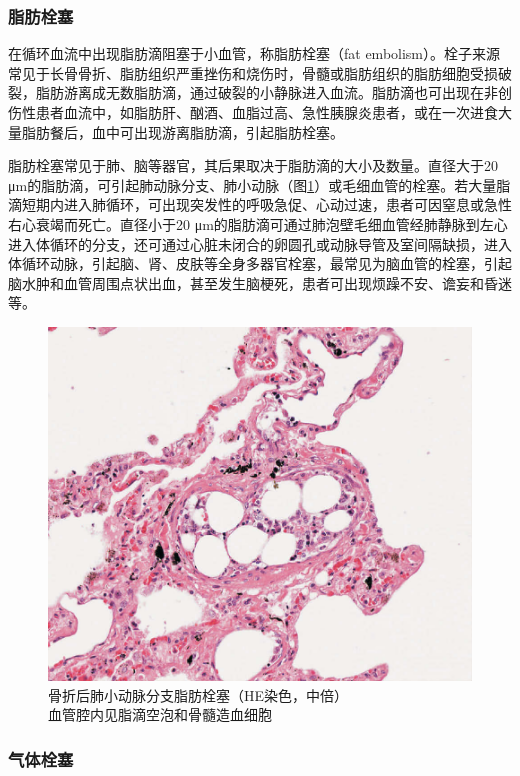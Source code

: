 \subsubsection{脂肪栓塞}

在循环血流中出现脂肪滴阻塞于小血管，称脂肪栓塞（fat
embolism）。栓子来源常见于长骨骨折、脂肪组织严重挫伤和烧伤时，骨髓或脂肪组织的脂肪细胞受损破裂，脂肪游离成无数脂肪滴，通过破裂的小静脉进入血流。脂肪滴也可出现在非创伤性患者血流中，如脂肪肝、酗酒、血脂过高、急性胰腺炎患者，或在一次进食大量脂肪餐后，血中可出现游离脂肪滴，引起脂肪栓塞。

脂肪栓塞常见于肺、脑等器官，其后果取决于脂肪滴的大小及数量。直径大于20
μm的脂肪滴，可引起肺动脉分支、肺小动脉（图\ref{fig3-10}）或毛细血管的栓塞。若大量脂滴短期内进入肺循环，可出现突发性的呼吸急促、心动过速，患者可因窒息或急性右心衰竭而死亡。直径小于20
μm的脂肪滴可通过肺泡壁毛细血管经肺静脉到左心进入体循环的分支，还可通过心脏未闭合的卵圆孔或动脉导管及室间隔缺损，进入体循环动脉，引起脑、肾、皮肤等全身多器官栓塞，最常见为脑血管的栓塞，引起脑水肿和血管周围点状出血，甚至发生脑梗死，患者可出现烦躁不安、谵妄和昏迷等。

\begin{figure}[!htbp]
  \centering
  \includegraphics{./images/Image00044.jpg}
  \caption{骨折后肺小动脉分支脂肪栓塞（HE染色，中倍） \\ {\small 血管腔内见脂滴空泡和骨髓造血细胞}}
  \label{fig3-10}
\end{figure}


\subsubsection{气体栓塞}

